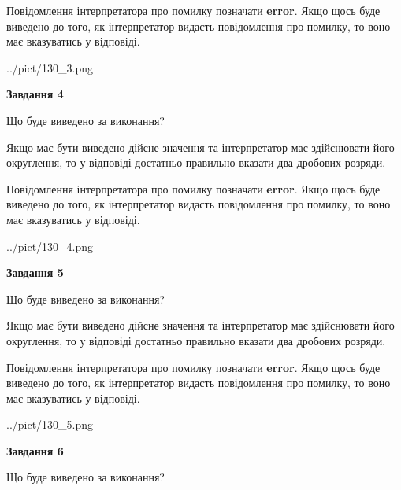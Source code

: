 \documentclass[12pt, ukrainian]{article}
\begin{document}
{\begin {Large}
Повідомлення інтерпретатора про помилку позначати \textbf{error}.
Якщо щось буде виведено до того, як інтерпретатор видасть повідомлення про помилку, 
то воно має вказуватись у відповіді. \par

\begin{center}
	{../pict/130_3.png}
\end{center}
\newpage

{\begin {center}\textbf{Завдання 4}\end {center}}\par
Що буде виведено за виконання? \par

Якщо має бути виведено дійсне значення та інтерпретатор має здійснювати його округлення, 
то у відповіді достатньо правильно вказати два дробових розряди.

Повідомлення інтерпретатора про помилку позначати \textbf{error}.
Якщо щось буде виведено до того, як інтерпретатор видасть повідомлення про помилку, 
то воно має вказуватись у відповіді. \par

\begin{center}
	{../pict/130_4.png}
\end{center}
\newpage

{\begin {center}\textbf{Завдання 5}\end {center}}\par
Що буде виведено за виконання? \par

Якщо має бути виведено дійсне значення та інтерпретатор має здійснювати його округлення, 
то у відповіді достатньо правильно вказати два дробових розряди.

Повідомлення інтерпретатора про помилку позначати \textbf{error}.
Якщо щось буде виведено до того, як інтерпретатор видасть повідомлення про помилку, 
то воно має вказуватись у відповіді. \par

\begin{center}
	{../pict/130_5.png}
\end{center}
\newpage

{\begin {center}\textbf{Завдання 6}\end {center}}\par
Що буде виведено за виконання? \par


\end{Large}}
\end{document}

